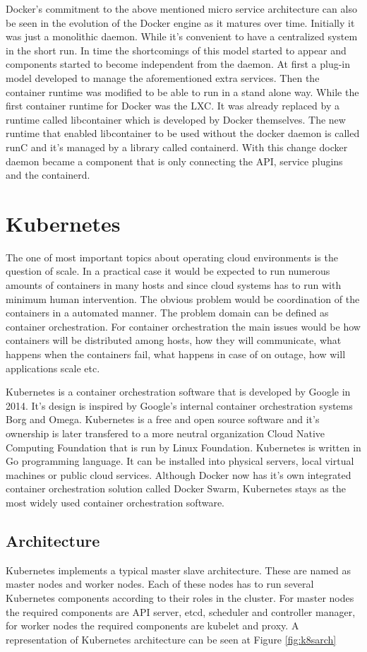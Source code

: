\documentclass[12pt,oneandhalf,chaparabic,ceng,ms,eng,oneside,pntc]{gsufbe}
\begin{document}
Docker's commitment to the above mentioned micro service architecture can also be seen in the evolution
of the Docker engine as it matures over time. Initially it was just a monolithic daemon. While it's
convenient to have a centralized system in the short run. In time the shortcomings of this model
started to appear and components started to become independent from the daemon. At first a plug-in
model developed to manage the aforementioned extra services. Then the container runtime was modified to
be able to run in a stand alone way. While the first container runtime for Docker was the LXC. It was
already replaced by a runtime called libcontainer which is developed by Docker themselves. The new
runtime that enabled libcontainer to be used without the docker daemon is called runC and it's managed
by a library called containerd. With this change docker daemon became a component that is only
connecting the API, service plugins and the containerd.

\section{Kubernetes}
The one of most important topics about operating cloud environments is the question of scale. In a
practical case it would be expected to run numerous amounts of containers in many hosts and since
cloud systems has to run with minimum human intervention. The obvious problem would be coordination
of the containers in a automated manner. The problem domain can be defined as container orchestration.
For container orchestration the main issues would be how containers will be distributed among hosts,
how they will communicate, what happens when the containers fail, what happens in case of on outage,
how will applications scale etc.

Kubernetes is a container orchestration software that is developed by Google in 2014. It's design is
inspired by Google's internal container orchestration systems Borg and Omega. Kubernetes is a free and
open source software and it's ownership is later transfered to a more neutral organization Cloud Native
Computing Foundation that is run by Linux Foundation. Kubernetes is written in Go programming language.
It can be installed into physical servers, local virtual machines or public cloud services. Although
Docker now has it's own integrated container orchestration solution called Docker Swarm, Kubernetes
stays as the most widely used container orchestration software.

\subsection{Architecture}
Kubernetes implements a typical master slave architecture. These are named as master nodes and worker
nodes. Each of these nodes has to run several Kubernetes components according to their roles in the
cluster. For master nodes the required components are API server, etcd, scheduler and
controller manager, for worker nodes the required components are kubelet and proxy. A representation
of Kubernetes architecture can be seen at Figure \ref{fig:k8sarch}
\end{document}
